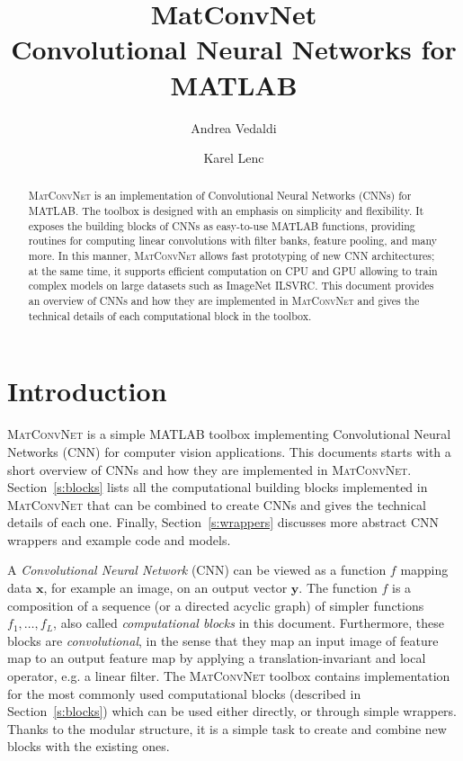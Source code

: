 \documentclass[12pt]{article}
\newcommand{\vlnn}{\textsc{MatConvNet}\xspace}
\newcommand{\bx}{\mathbf{x}}
\newcommand{\by}{\mathbf{y}}
\begin{document}
\title{MatConvNet \\
\Large
Convolutional Neural Networks for MATLAB}
\author{
Andrea Vedaldi
\and
Karel Lenc}
\date{}
\maketitle{}

\begin{abstract}
\vlnn is an implementation of Convolutional Neural Networks (CNNs) for MATLAB. The toolbox is designed with an emphasis on simplicity and flexibility. It exposes the building blocks of CNNs as easy-to-use MATLAB functions, providing routines for computing linear convolutions with filter banks, feature pooling, and many more. In this manner, \vlnn allows fast prototyping of new CNN architectures; at the same time, it supports efficient computation on CPU and GPU allowing to train complex models on large datasets such as ImageNet ILSVRC. This document provides an overview of CNNs and how they are implemented in \vlnn and gives the technical details of each computational block in the toolbox.
\end{abstract}

\newpage
\tableofcontents{}

\section{Introduction}\label{s:intro}

\vlnn is a simple MATLAB toolbox implementing Convolutional Neural Networks (CNN) for computer vision applications. This documents starts with a short overview of CNNs and how they are implemented in \vlnn. Section~\ref{s:blocks} lists all the computational building blocks implemented in \vlnn that can be combined to create CNNs and gives the technical details of each one. Finally, Section~\ref{s:wrappers} discusses more abstract CNN wrappers and example code and models.

A \emph{Convolutional Neural Network} (CNN) can be viewed as a function $f$ mapping data $\bx$, for example an image, on an output vector $\by$. The function $f$ is a composition of a sequence (or a directed acyclic graph) of simpler functions $f_1,\dots,f_L$, also called \emph{computational blocks} in this document. Furthermore, these blocks are \emph{convolutional}, in the sense that they map an input image of feature map to an output feature map by applying a translation-invariant and local operator, e.g. a linear filter. The \vlnn toolbox contains implementation for the most commonly used computational blocks (described in Section~\ref{s:blocks}) which can be used either directly, or through simple wrappers. Thanks to the modular structure, it is a simple task to create and combine new blocks with the existing ones. %
\end{document}
